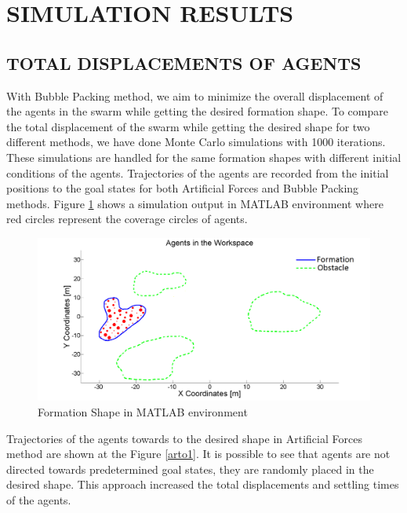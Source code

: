 \documentclass[letterpaper, 10 pt, conference]{ieeeconf}  %
\begin{document}
\section{SIMULATION RESULTS} 
\subsection{TOTAL DISPLACEMENTS OF AGENTS}  \label{total_dist_ref}
		
With Bubble Packing method, we aim to minimize the overall displacement of the agents in the swarm while getting the desired formation shape. To compare the total displacement of the swarm while getting the desired shape for two different methods, we have done Monte Carlo simulations with 1000 iterations. These simulations are handled for the same formation shapes with different initial conditions of the agents. Trajectories of the agents are recorded from the initial positions to the goal states for both Artificial Forces and Bubble Packing methods. Figure \ref{shape1_ref} shows a simulation output in MATLAB environment where red circles represent the coverage circles of agents.		

\begin{figure}[thpb]
\caption{Formation Shape in MATLAB environment}\label{shape1_ref}
\centerline{\includegraphics[scale = 0.17]{Trajectories_Formation_Shape_1_2}}
\end{figure} 

Trajectories of the agents towards to the desired shape in Artificial Forces method are shown at the Figure \ref{arto1}. It is possible to see that agents are not directed towards predetermined goal states, they are randomly placed in the desired shape. This approach increased the total displacements and settling times of the agents.		
\end{document}
